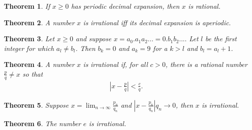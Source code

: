 \documentclass{article}
\theoremstyle{sltheorem}
\newtheorem{theorem}{Theorem}[section]
\begin{document}
\begin{theorem}
    If $x\geq 0$ has periodic decimal expansion, then $x$ is rational.
\end{theorem}
\begin{theorem}
    A number $x$ is irrational iff its decimal expansion is aperiodic.
\end{theorem}
\begin{theorem}
    Let $x\geq 0$ and suppose $x=a_0.a_1a_2...=0.b_1b_2....$ Let $l$ be the first integer for which $a_l\not=b_l$. Then $b_k=0$ and $a_k=9$ for a $k>l$ and $b_l=a_l+1$.
\end{theorem}
\begin{theorem}
    A number $x$ is irrational if, for all $c>0$, there is a rational number $\frac{p}{q}\not=x$ so that
    \begin{align*}
        \left|x-\frac{p}{q}\right|<\frac{c}{q}.
    \end{align*}
\end{theorem}
\begin{theorem}
    Suppose $x=\lim_{n\to\infty}\frac{p_n}{q_n}$ and $\left|x-\frac{p_n}{q_n}\right|q_n \to 0$, then $x$ is irrational.
\end{theorem}
\begin{theorem}
    The number $e$ is irrational.
\end{theorem}
\end{document}
